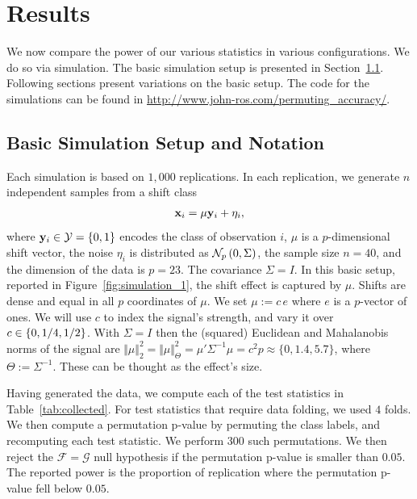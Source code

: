 \documentclass[]{bio}
\begin{document}
\section{Results}
\label{sec:results}
We now compare the power of our various statistics in various configurations. 
We do so via simulation.
The basic simulation setup is presented in Section~\ref{sec:simulation_details}.
Following sections present variations on the basic setup.
The \R code for the simulations can be found in \url{http://www.john-ros.com/permuting_accuracy/}.


\subsection{Basic Simulation Setup and Notation}
\label{sec:simulation_details}

Each simulation is based on $1,000$ replications. 
In each replication, we generate $n$ independent samples from a shift class 
\begin{align}
\label{eq:distribution}
\mathbf{x}_i = \mu \mathbf{y}_i + \eta_i,
\end{align}
where $\mathbf{y}_i \in \mathcal{Y}=\{ 0,1 \}$ encodes the class of observation $i$, $\mu$ is a $p$-dimensional shift vector, the noise $\eta_i$ is distributed as $\mathcal{N}_{p}\left(0,\Sigma\right)$, the sample size $n=40$, and the dimension of the data is $p=23$. 
The covariance $\Sigma=I$. 
In this basic setup, reported in Figure~\ref{fig:simulation_1}, the shift effect is captured by $\mu$. 
Shifts are dense and equal in all $p$ coordinates of $\mu$.
We set $\mu:=c \, e$ where $e$ is a $p$-vector of ones. 
We will use $c$ to index the signal's strength, and vary it over $c \in \{ 0,1/4,1/2 \}$.
With $\Sigma=I$ then the (squared) Euclidean and Mahalanobis norms of the signal are $\Vert \mu \Vert_2^2=\Vert \mu \Vert_\Theta^2=\mu' \Sigma^{-1} \mu= c^2 p\approx \{0,1.4,5.7\}$, where $\Theta:=\Sigma^{-1}$. 
These can be thought as the effect's size. 


Having generated the data, we compute each of the test statistics in Table~\ref{tab:collected}.
For test statistics that require data folding, we used $4$ folds. 
We then compute a permutation p-value by permuting the class labels, and recomputing each test statistic. 
We perform $300$ such permutations. 
We then reject the $\mathcal{F}=\mathcal{G}$ null hypothesis if the permutation p-value is smaller than $0.05$.
The reported power is the proportion of replication where the permutation p-value fell below $0.05$.
\end{document}
